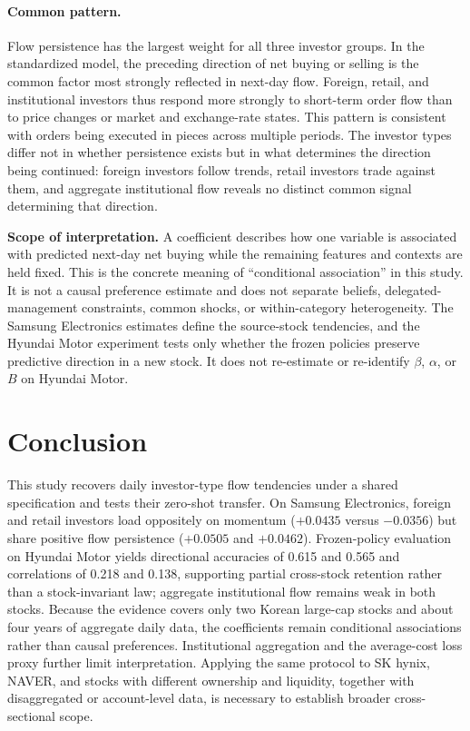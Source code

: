 \documentclass[sigconf,anonymous,review]{acmart}
\begin{document}
\paragraph{Common pattern.}
Flow persistence has the largest weight for all three investor groups. In the standardized model, the preceding direction of net buying or selling is the common factor most strongly reflected in next-day flow. Foreign, retail, and institutional investors thus respond more strongly to short-term order flow than to price changes or market and exchange-rate states. This pattern is consistent with orders being executed in pieces across multiple periods. The investor types differ not in whether persistence exists but in what determines the direction being continued: foreign investors follow trends, retail investors trade against them, and aggregate institutional flow reveals no distinct common signal determining that direction.

\textbf{Scope of interpretation.} A coefficient describes how one variable is associated with predicted next-day net buying while the remaining features and contexts are held fixed. This is the concrete meaning of ``conditional association'' in this study. It is not a causal preference estimate and does not separate beliefs, delegated-management constraints, common shocks, or within-category heterogeneity. The Samsung Electronics estimates define the source-stock tendencies, and the Hyundai Motor experiment tests only whether the frozen policies preserve predictive direction in a new stock. It does not re-estimate or re-identify $\beta$, $\alpha$, or $B$ on Hyundai Motor.

\section{Conclusion}
\label{sec:conclusion}

This study recovers daily investor-type flow tendencies under a shared specification and tests their zero-shot transfer. On Samsung Electronics, foreign and retail investors load oppositely on momentum ($+0.0435$ versus $-0.0356$) but share positive flow persistence ($+0.0505$ and $+0.0462$). Frozen-policy evaluation on Hyundai Motor yields directional accuracies of 0.615 and 0.565 and correlations of 0.218 and 0.138, supporting partial cross-stock retention rather than a stock-invariant law; aggregate institutional flow remains weak in both stocks. Because the evidence covers only two Korean large-cap stocks and about four years of aggregate daily data, the coefficients remain conditional associations rather than causal preferences. Institutional aggregation and the average-cost loss proxy further limit interpretation. Applying the same protocol to SK hynix, NAVER, and stocks with different ownership and liquidity, together with disaggregated or account-level data, is necessary to establish broader cross-sectional scope.
\end{document}
